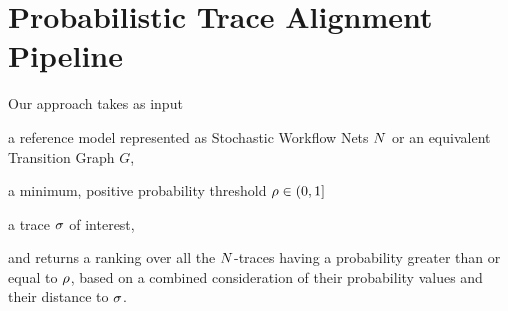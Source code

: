 
\section{Probabilistic Trace Alignment Pipeline}
Our approach takes as input
\begin{inparaenum}[\it (i)]
	\item a reference model represented as Stochastic Workflow Nets $N$ or an equivalent Transition Graph $G$,
	\item a minimum, positive probability threshold $\rho \in (0,1]$
	\item a trace $\sigma$ of interest,
\end{inparaenum}
and returns a ranking over all the $N$-traces having a probability greater than or equal to $\rho$, based on a combined consideration of their probability values and their distance to $\sigma$. 

